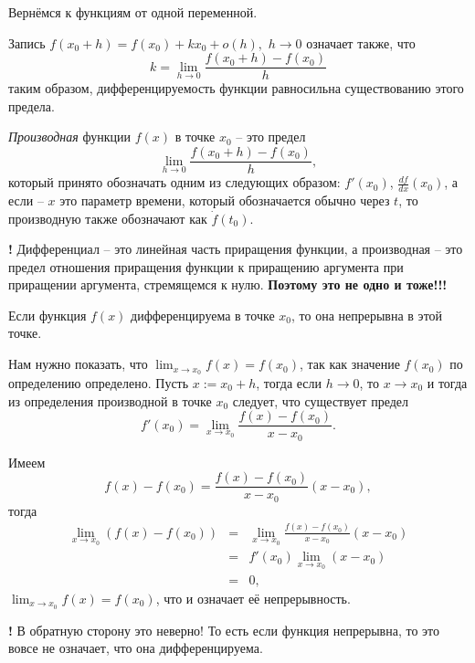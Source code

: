 Вернёмся к функциям от одной переменной.

Запись $f(x_0+h) = f(x_0)+kx_0 + o(h),$ $h \to 0$ означает также, что
\[
 k = \lim_{h \to 0} \frac{f(x_0 +h) - f(x_0)}{h}
\]
таким образом, дифференцируемость функции равносильна существованию этого предела.

\begin{definition}
    \textit{Производная} функции $f(x)$ в точке $x_0$ -- это предел 
    \[
 \lim_{h\to 0} \frac{f(x_0 + h) - f(x_0)}{h},
    \]
    который принято обозначать одним из следующих образом: $f'(x_0)$, $\frac{d f}{dx}(x_0)$, а если -- $x$ это параметр времени, который обозначается обычно через $t$, то производную также обозначают как $\dot{f}(t_0)$.
\end{definition}

\begin{mydanger}{\bf{!}}
    Дифференциал -- это линейная часть приращения функции, а производная -- это предел отношения приращения функции к приращению аргумента при приращении аргумента, стремящемся к нулю. \textbf{Поэтому это не одно и тоже!!!}
\end{mydanger}


\begin{theorem}\label{diff=contionous(for one varibale)}
    Если функция $f(x)$ дифференцируема в точке $x_0$, то она непрерывна в этой точке.
\end{theorem}

Нам нужно показать, что $\lim_{x \to x_0}f(x) = f(x_0)$, так как значение $f(x_0)$ по определению определено. Пусть $x:=x_0 +h$, тогда если $h \to 0$, то $x \to x_0$ и тогда из определения производной в точке $x_0$ следует, что существует предел
\[
 f'(x_0) = \lim_{x\to x_0} \frac{f(x) - f(x_0)}{x-x_0}.
\]

Имеем
\[
 f(x) - f(x_0) = \frac{f(x) - f(x_0)}{x-x_0}(x-x_0),
\]
тогда
\begin{eqnarray*}
     \lim_{x \to x_0} (f(x) - f(x_0))  &=& \lim_{x \to x_0}\frac{f(x) - f(x_0)}{x-x_0}(x-x_0) \\
     &=& f'(x_0) \lim_{x \to x_0}(x-x_0) \\
     &=& 0,
\end{eqnarray*}
\ie $\lim_{x \to x_0} f(x) = f(x_0)$, что и означает её непрерывность.\\

\begin{mydanger}{\bf{!}}
    В обратную сторону это неверно! То есть если функция непрерывна, то это вовсе не означает, что она дифференцируема.
\end{mydanger}





